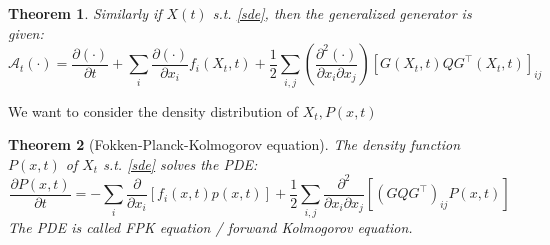 \documentclass{ctexart}
\newtheorem{theorem}{Theorem}
\begin{document}
\begin{theorem}
    Similarly if $X(t)$ s.t. \ref{sde}, then the generalized generator is given:
    \begin{equation}
        \mathcal{A}_{t}(\cdot)=\frac{\partial(\cdot)}{\partial t}+\sum_{i} \frac{\partial(\cdot)}{\partial x_{i}} f_{i}(X_t, t)+\frac{1}{2} \sum_{i, j}\left(\frac{\partial^{2}(\cdot)}{\partial x_{i} \partial x_{j}}\right)\left[G(X_t, t) Q G^{\top}(X_t, t)\right]_{i j}
    \end{equation}
\end{theorem}
We want to consider the density distribution of $X_t, P(x, t)$
\begin{theorem}[Fokken-Planck-Kolmogorov equation]
    The density function $P(x, t)$ of $X_t$ s.t. \ref{sde} solves the PDE:
    \begin{equation}
        \frac{\partial P(x, t)}{\partial t}=-\sum_{i} \frac{\partial}{\partial x_{i}}\left[f_{i}(x, t) p(x, t)\right]+\frac{1}{2} \sum_{i, j} \frac{\partial^{2}}{\partial x_{i} \partial x_{j}}\left[\left(G Q G^{\top}\right)_{i j} P(x, t)\right]
    \end{equation}
    The PDE is called FPK equation / forwand Kolmogorov equation.
\end{theorem}
\end{document}
